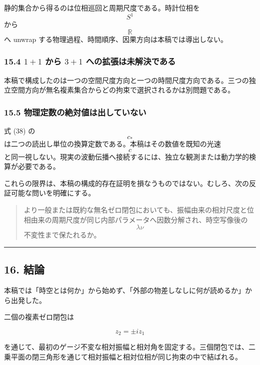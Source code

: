 \documentclass[
  a4paper,
]{ltjsarticle}
\begin{document}
静的集合から得るのは位相巡回と周期尺度である。時計位相を \[S^1\] から
\[\mathbb R\] へ unwrap
する物理過程、時間順序、因果方向は本稿では導出しない。

\subsubsection{\texorpdfstring{15.4 \(1+1\) から \(3+1\)
への拡張は未解決である}{15.4 1+1 から 3+1 への拡張は未解決である}}\label{ux304bux3089-31-ux3078ux306eux62e1ux5f35ux306fux672aux89e3ux6c7aux3067ux3042ux308b}

本稿で構成したのは一つの空間尺度方向と一つの時間尺度方向である。三つの独立空間方向が無名複素集合からどの拘束で選択されるかは別問題である。

\subsubsection{15.5
物理定数の絶対値は出していない}\label{ux7269ux7406ux5b9aux6570ux306eux7d76ux5bfeux5024ux306fux51faux3057ux3066ux3044ux306aux3044}

式 (38) の \[c_*\]
は二つの読出し単位の換算定数である。本稿はその数値を既知の光速 \[c\]
と同一視しない。現実の波動伝播へ接続するには、独立な観測または動力学的検算が必要である。

これらの限界は、本稿の構成的存在証明を損なうものではない。むしろ、次の反証可能な問いを明確にする。

\begin{quote}
より一般または既約な無名ゼロ閉包においても、振幅由来の相対尺度と位相由来の周期尺度が同じ内部パラメータへ因数分解され、時空写像後の
\[\lambda\nu\] 不変性まで保たれるか。
\end{quote}

\begin{center}\rule{0.5\linewidth}{0.5pt}\end{center}

\subsection{16. 結論}\label{ux7d50ux8ad6}

本稿では「時空とは何か」から始めず、「外部の物差しなしに何が読めるか」から出発した。

二個の複素ゼロ閉包は

\[
z_2=\pm iz_1
\]

を通じて、最初のゲージ不変な相対振幅と相対角を固定する。三個閉包では、二乗平面の閉三角形を通じて相対振幅と相対位相が同じ拘束の中で結ばれる。
\end{document}
